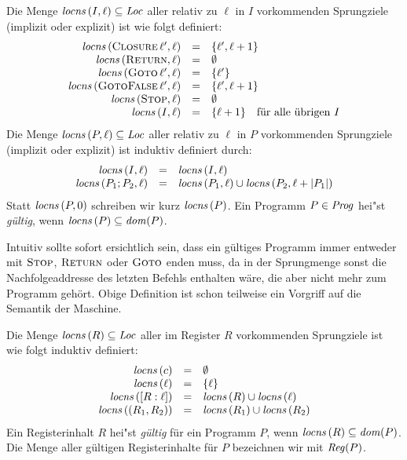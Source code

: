 \documentclass[12pt,fleqn]{article}
\begin{document}
\begin{definition}
  Die Menge ${\text{\it locns\/}}\,(I,\ell)\subseteq{\text{\it Loc\/}}$ aller relativ zu $\ell$ in $I$ vorkommenden Sprungziele (implizit oder
  explizit) ist wie folgt definiert:
  \[\begin{array}{rcl}
    {\text{\it locns\/}}\,(\textsc{Closure}\,\ell',\ell) &=& \{\ell',\ell+1\} \\
    {\text{\it locns\/}}\,(\textsc{Return},\ell) &=& \emptyset \\
    {\text{\it locns\/}}\,(\textsc{Goto}\,\ell',\ell) &=& \{\ell'\} \\
    {\text{\it locns\/}}\,(\textsc{GotoFalse}\,\ell',\ell) &=& \{\ell',\ell+1\} \\
    {\text{\it locns\/}}\,(\textsc{Stop},\ell) &=& \emptyset \\
    {\text{\it locns\/}}\,(I,\ell) &=& \{\ell+1\} \quad \text{f\"ur alle \"ubrigen $I$}
  \end{array}\]
  Die Menge ${\text{\it locns\/}}\,(P,\ell)\subseteq{\text{\it Loc\/}}$ aller relativ zu $\ell$ in $P$ vorkommenden Sprungziele (implizit oder
  explizit) ist induktiv definiert durch:
  \[\begin{array}{rcl}
    {\text{\it locns\/}}\,(I,\ell) &=& {\text{\it locns\/}}\,(I,\ell) \\
    {\text{\it locns\/}}\,(P_1;P_2,\ell) &=& {\text{\it locns\/}}\,(P_1,\ell) \cup {\text{\it locns\/}}\,(P_2,\ell+|P_1|)
  \end{array}\]
  Statt ${\text{\it locns\/}}\,(P,0)$ schreiben wir kurz ${\text{\it locns\/}}\,(P)$.
  Ein Programm $P\in{\text{\it Prog\/}}$ hei"st {\em g\"ultig}, wenn ${\text{\it locns\/}}\,(P) \subseteq {\text{\it dom\/}}(P)$.
\end{definition}

Intuitiv sollte sofort ersichtlich sein, dass ein g\"ultiges Programm immer entweder mit $\textsc{Stop}$,
$\textsc{Return}$ oder $\textsc{Goto}$ enden muss, da in der Sprungmenge sonst die Nachfolgeaddresse des
letzten Befehls enthalten w\"are, die aber nicht mehr zum Programm geh\"ort. Obige Definition ist schon
teilweise ein Vorgriff auf die Semantik der Maschine.

\begin{definition}
  Die Menge ${\text{\it locns\/}}\,(R) \subseteq {\text{\it Loc\/}}$ aller im Register $R$ vorkommenden Sprungziele ist wie folgt induktiv
  definiert:
  \[\begin{array}{rcl}
    {\text{\it locns\/}}\,(c) &=& \emptyset \\
    {\text{\it locns\/}}\,(\ell) &=& \{\ell\} \\
    {\text{\it locns\/}}\,([R:\ell]) &=& {\text{\it locns\/}}\,(R) \cup {\text{\it locns\/}}\,(\ell) \\
    {\text{\it locns\/}}\,((R_1,R_2)) &=& {\text{\it locns\/}}\,(R_1) \cup {\text{\it locns\/}}\,(R_2)
  \end{array}\]
  Ein Registerinhalt $R$ hei"st {\em g\"ultig} f\"ur ein Programm $P$, wenn ${\text{\it locns\/}}\,(R)\subseteq{\text{\it dom\/}}(P)$. Die Menge
  aller g\"ultigen Registerinhalte f\"ur $P$ bezeichnen wir mit ${\text{\it Reg\/}}(P)$.
\end{definition}
\end{document}
